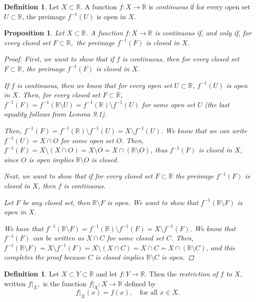 \documentclass[11pt]{article}
\newcommand{\bbR}{\mathbb{R}}
\providecommand{\arr}{\to}
\providecommand{\sm}{\setminus}
\renewcommand{\_}[1]{\underline{ #1 }}
\newtheorem{proposition}[theorem]{Proposition}
\theoremstyle{definition}
\newtheorem{definition}[theorem]{Definition}
\numberwithin{equation}{subsection}
\begin{document}
\begin{definition} \label{continuity} Let $X\subset \bbR$. A function $f \colon X \arr \bbR$ is \emph{continuous} if for every open set $U \subset \bbR$, the preimage $f^{-1}(U)$ is open in $X$.
\end{definition}

\begin{proposition} Let $X\subset \bbR$. A function  $f\colon X\arr \bbR$ is continuous if, and only if, for every closed set $F\subset \bbR,$ the preimage $f^{-1}(F)$ is closed in $X$.

\begin{proof}
First, we want to show that if $f$ is continuous, then for every closed set $F \subset \bbR$, the preimage $f^{-1}(F)$ is closed in $X$. 

If $f$ is continuous, then we know that for every open set $U \subset \bbR$, $f^{-1}(U)$ is open in $X$. Then, for every closed set $F \subset \bbR$, $f^{-1}(F) = f^{-1}(\bbR \sm U) = f^{-1}(\bbR) \sm f^{-1}(U)$ for some open set $U$ (the last equality follows from Lemma 9.1). 

Then, $f^{-1}(F) = f^{-1}(\bbR) \sm f^{-1}(U) = X \sm f^{-1}(U)$. We know that we can write $f^{-1}(U) = X \cap O$ for some open set $O$. Then, $f^{-1}(F)= X \sm (X \cap O)= X \sm O = X \cap (\bbR \sm O)$, thus $f^{-1}(F)$ is closed in $X$, since $O$ is open implies $\bbR \sm O$ is closed. 

Next, we want to show that if for every closed set $F \subset \bbR$ the preimage $f^{-1}(F)$ is closed in $X$, then $f$ is continuous. 

Let $F$ be any closed set, then $\bbR \sm F$ is open. We want to show that $f^{-1}(\bbR \sm F)$ is open in $X$. 

We have that $f^{-1}(\bbR \sm F)=f^{-1}(\bbR) \sm f^{-1}(F) = X \sm f^{-1}(F)$. We know that $f^{-1}(F)$ can be written as $X \cap C$ for some closed set $C$. Then, $f^{-1}(\bbR \sm F) =X \sm f^{-1}(F) = X \sm (X \cap C) = X \cap C = X \cap (\bbR \sm C)$, and this completes the proof because $C$ is closed implies $\bbR \sm C$ is open.

\renewcommand\qedsymbol{QED}
\end{proof}

\end{proposition}

\begin{definition}
Let $X\subset Y\subset \bbR$ and let $f:Y\longrightarrow \bbR.$ Then the {\em restriction of $f$ to $X,$} written $f|_X,$ is the function
$f|_X : X\longrightarrow \bbR$ defined by 
$$f|_X (x)=f(x),\quad \text{for all }x\in X.$$
\end{definition} 
\end{document}
